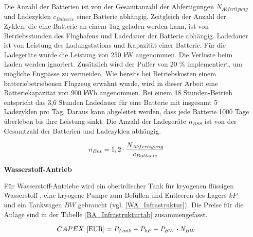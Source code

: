 Die Anzahl der Batterien ist von der Gesamtanzahl der Abfertigungen $N_{Abfertigung}$ und Ladezyklen $c_{Batterie}$ einer Batterie abhängig. 
Zeitgleich der Anzahl der Zyklen, die eine Batterie an einem Tag geladen werden kann, ist von Betriebsstunden des Flughafens und 
Ladedauer der Batterie abhängig. 
Ladedauer ist von Leistung des Ladungstations und Kapazität einer Batterie.
Für die Ladegeräte wurde die Leistung von 250 kW angenommen. Die Verluste beim Laden werden ignoriert. 
Zusätzlich wird der Puffer von 20 \% implementiert, um mögliche Engpässe zu vermeiden. 
Wie bereits bei Betriebskosten einem batteriebetriebenen Flugzeug erwähnt wurde, wird in dieser Arbeit eine Batteriekapazität von 900 kWh angenommen.
Bei einem 18 Stunden-Betrieb entspricht das 3,6 Stunden Ladedauer für eine Batterie mit insgesamt 5 Ladezyklen pro Tag. Daraus kann abgeleitet werden, dass
jede Batterie 1000 Tage überleben bis ihre Leistung sinkt.
Die Anzahl der Ladegeräte $n_{BSS}$ ist von der Gesamtzahl der Batterien und Ladezyklen abhängig.
\cite{salucci2020optimal}

\begin{equation}
  {n_{Bat}} = {1,2} \cdot \frac{N_{Abfertigung}}{c_{Batterie}}\\
  \label{BatAnzahl}
  \end{equation}

\textbf{Wasserstoff-Antrieb}


Für Wasserstoff-Antriebe wird ein oberirdischer Tank für kryogenen flüssigen Wasserstoff , 
eine kryogene Pumpe zum Befüllen und Entleeren des Lagers ${kP}$ und ein Tankwagen ${BW}$ gebraucht (vgl. \eqref{WA_Infrastruktur}). 
Die Preise für die Anlage sind in der Tabelle \ref{BA_Infrastrukturtab} zusammengefasst.

\begin{equation}
   {CAPEX ~[\text{EUR}]} = {P_{Tank}} + P_{kP} + P_{BW} \cdot N_{BW}  \\
   \label{WA_Infrastruktur}
\end{equation}

